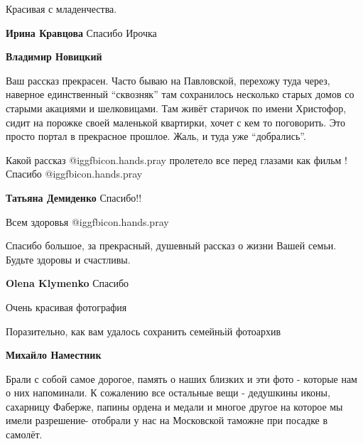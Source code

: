  
 
 
 
 

Красивая с младенчества.

\textbf{Ирина Кравцова} Спасибо Ирочка

\textbf{Владимир Новицкий} 

Ваш рассказ прекрасен. Часто бываю на Павловской, перехожу туда через, наверное
единственный \enquote{сквозняк} там сохранилось несколько старых домов со старыми
акациями и шелковицами. Там живёт старичок по имени Христофор, сидит на порожке
своей маленькой квартирки, хочет с кем то поговорить. Это просто портал в
прекрасное прошлое. Жаль, и туда уже \enquote{добрались}.


Какой рассказ @igg{fbicon.hands.pray} пролетело все перед глазами как фильм
!Спасибо @igg{fbicon.hands.pray} 

\textbf{Татьяна Демиденко} Спасибо!!

Всем здоровья  @igg{fbicon.hands.pray} 


Спасибо большое, за прекрасный, душевный рассказ о жизни Вашей семьи. Будьте
здоровы и счастливы.

\textbf{Olena Klymenko} Спасибо

Очень красивая фотография

Поразительно, как вам удалось сохранить семейньій фотоархив

\textbf{Михайло Наместник} 

Брали с собой самое дорогое, память о наших близких и эти фото - которые нам о
них напоминали. К сожалению все остальные вещи - дедушкины иконы, сахарницу
Фаберже, папины ордена и медали и многое другое на которое мы имели разрешение-
отобрали у нас на Московской таможне при посадке в самолёт.
